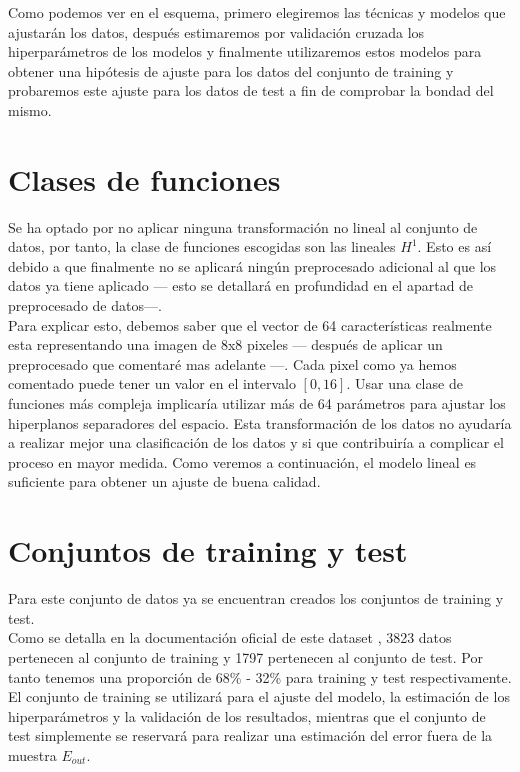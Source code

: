 Como podemos ver en el esquema, primero elegiremos las técnicas y modelos que ajustarán los datos, después estimaremos por validación cruzada los hiperparámetros de los modelos y finalmente utilizaremos estos modelos para obtener una hipótesis de ajuste para los datos del conjunto de training y probaremos este ajuste para los datos de test a fin de comprobar la bondad del mismo.
\newpage
\section{Clases de funciones}
Se ha optado por no aplicar ninguna transformación no lineal al conjunto de datos, por tanto, la clase de funciones escogidas son las lineales $H^{1}$. Esto es así debido a que finalmente no se aplicará ningún preprocesado adicional al que los datos ya tiene aplicado --- esto se detallará en profundidad en el apartad de preprocesado de datos---.\\
Para explicar esto, debemos saber que el vector de 64 características realmente esta representando una imagen de 8x8 pixeles --- después de aplicar un preprocesado que comentaré mas adelante ---. Cada pixel como ya hemos comentado puede tener un valor en el intervalo $[0,16]$.
Usar una clase de funciones más compleja implicaría utilizar más de 64 parámetros para ajustar los hiperplanos separadores del espacio. Esta transformación de los datos no ayudaría a realizar mejor una clasificación de los datos y si que contribuiría a complicar el proceso en mayor medida. Como veremos a continuación, el modelo lineal es suficiente para obtener un ajuste de buena calidad.

\section{Conjuntos de training y test}
Para este conjunto de datos ya se encuentran creados los conjuntos de training y test.\\
Como se detalla en la documentación oficial de este dataset \cite{Optical}, 3823 datos pertenecen al conjunto de training y 1797 pertenecen al conjunto de test. Por tanto tenemos una proporción de 68\% - 32\% para training y test respectivamente.\\
El conjunto de training se utilizará para el ajuste del modelo, la estimación de los hiperparámetros y la validación de los resultados, mientras que el conjunto de test simplemente se reservará para realizar una estimación del error fuera de la muestra $E_{out}$.

